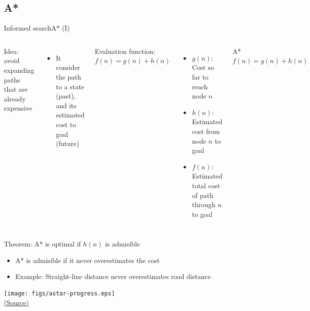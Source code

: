 \documentclass[10pt,compress]{beamer} %
\begin{document}
\subsection{A*}

\begin{frame}{Informed search}{A* (I)}
    \begin{columns}
            Idea: avoid expanding paths that are already expensive
            \begin{itemize}
                \item It consider the path to a state (past), and its estimated cost to goal (future)
            \end{itemize}

            Evaluation function: $f(n) = g(n) + h(n)$
            \begin{itemize}
                \item $g(n)$: Cost so far to reach node $n$
                \item $h(n)$: Estimated cost from node $n$ to goal
                \item $f(n)$: Estimated total cost of path through $n$ to goal
            \end{itemize}

            \begin{block}{A*}
                $f(n) = g(n) + h (n)$
            \end{block}
    \end{columns}

    \bigskip

    Theorem: A* is optimal if $h(n)$ is \alert{admisible}
        \begin{itemize}
        \item A* is admisible if it never overestimates the cost
        \item Example: Straight-line distance never overestimates road distance
        \end{itemize}
    \bigskip
\end{frame}

\begin{frame}
      \begin{center}
          \quad \texttt{[image: figs/astar-progress.eps]}\\
          \tiny{\href{http://aima.cs.berkeley.edu/index.html}{(Source)}}
      \end{center}
\end{frame}
\end{document}

